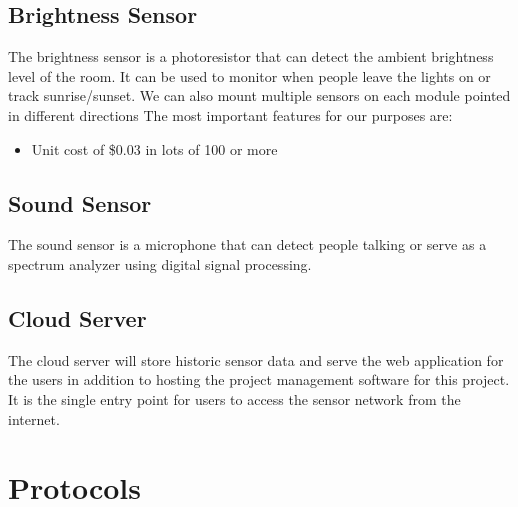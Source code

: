 		\subsection{Brightness Sensor}
			The brightness sensor is a photoresistor that can detect the ambient brightness level of the room. It can be used to monitor when people leave the lights on or track sunrise/sunset. We can also mount multiple sensors on each module pointed in different directions The most important features for our purposes are:
			\begin{itemize}
				\item Unit cost of \$0.03 in lots of 100 or more
			\end{itemize}
		
		\subsection{Sound Sensor}
			The sound sensor is a microphone that can detect people talking or serve as a spectrum analyzer using digital signal processing. %
		
		
		\subsection{Cloud Server}
			The cloud server will store historic sensor data and serve the web application for the users in addition to hosting the project management software for this project. It is the single entry point for users to access the sensor network from the internet.
	 
	\section{Protocols}
